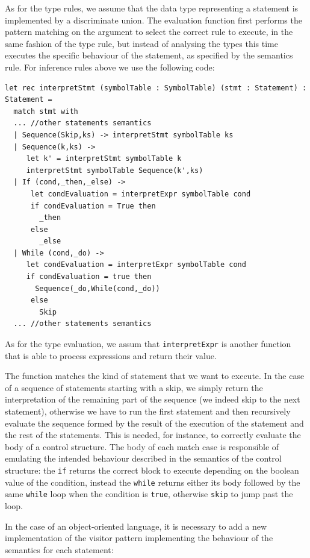 As for the type rules, we assume that the data type representing a statement is implemented by a discriminate union. The evaluation function first performs the pattern matching on the argument to select the correct rule to execute, in the same fashion of the type rule, but instead of analysing the types this time executes the specific behaviour of the statement, as specified by the semantics rule. For inference rules above we use the following code:

\begin{lstlisting}
let rec interpretStmt (symbolTable : SymbolTable) (stmt : Statement) : Statement =
  match stmt with
  ... //other statements semantics
  | Sequence(Skip,ks) -> interpretStmt symbolTable ks
  | Sequence(k,ks) ->
  	 let k' = interpretStmt symbolTable k
  	 interpretStmt symbolTable Sequence(k',ks)
  | If (cond,_then,_else) ->
      let condEvaluation = interpretExpr symbolTable cond
      if condEvaluation = True then
      	_then
      else
        _else
  | While (cond,_do) ->
     let condEvaluation = interpretExpr symbolTable cond
     if condEvaluation = true then
       Sequence(_do,While(cond,_do))
      else
        Skip
  ... //other statements semantics
\end{lstlisting}

As for the type evaluation, we assum that \texttt{interpretExpr} is another function that is able to process expressions and return their value. 

The function matches the kind of statement that we want to execute. In the case of a sequence of statements starting with a skip, we simply return the interpretation of the remaining part of the sequence (we indeed skip to the next statement), otherwise we have to run the first statement and then recursively evaluate the sequence formed by the result of the execution of the statement and the rest of the statements. This is needed, for instance, to correctly evaluate the body of a control structure. The body of each match case is responsible of emulating the intended behaviour described in the semantics of the control structure: the \texttt{if} returns the correct block to execute depending on the boolean value of the condition, instead the \texttt{while} returns either its body followed by the same \texttt{while} loop when the condition is \texttt{true}, otherwise \texttt{skip} to jump past the loop.

In the case of an object-oriented language, it is necessary to add a new implementation of the visitor pattern implementing the behaviour of the semantics for each statement:

